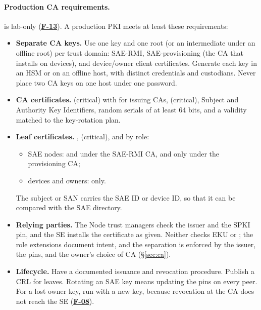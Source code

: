 \documentclass[11pt,a4paper]{article}
\newcommand{\fid}[1]{\textbf{#1}}
\begin{document}
\paragraph{Production CA requirements.}  is lab-only (\hyperref[f:F-13]{\fid{F-13}}). A production PKI meets at least these requirements:
\begin{itemize}
\item \textbf{Separate CA keys.} Use one key and one root (or an intermediate under an offline root) per trust domain: SAE-RMI, SAE-provisioning (the CA that  installs on devices), and device/owner client certificates. Generate each key in an HSM or on an offline host, with distinct credentials and custodians. Never place two CA keys on one host under one password.
\item \textbf{CA certificates.}  (critical) with  for issuing CAs,  (critical), Subject and Authority Key Identifiers, random serials of at least 64 bits, and a validity matched to the key-rotation plan.
\item \textbf{Leaf certificates.} ,  (critical), and  by role:
  \begin{itemize}
  \item SAE nodes:  and  under the SAE-RMI CA, and  only under the provisioning CA;
  \item devices and owners:  only.
  \end{itemize}
  The subject or SAN carries the SAE ID or device ID, so that it can be compared with the SAE directory.
\item \textbf{Relying parties.} The Node trust managers check the issuer and the SPKI pin, and the SE installs the  certificate as given. Neither checks EKU or ; the role extensions document intent, and the separation is enforced by the issuer, the pins, and the owner's choice of CA (\S\ref{sec:ca}).
\item \textbf{Lifecycle.} Have a documented issuance and revocation procedure. Publish a CRL for  leaves. Rotating an SAE key means updating the pins on every peer. For a lost owner key, run  with a new key, because revocation at the CA does not reach the SE (\hyperref[f:F-08]{\fid{F-08}}).
\end{itemize}
\end{document}
